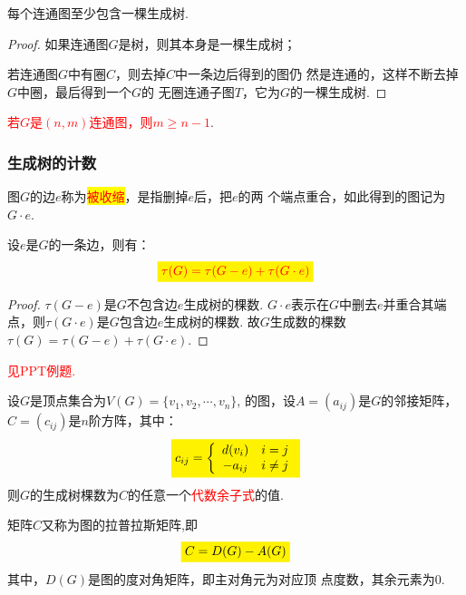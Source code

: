 \begin{theorem}
	每个连通图至少包含一棵生成树.
\end{theorem}
\begin{proof}
	如果连通图$G$是树，则其本身是一棵生成树；
	
	若连通图$G$中有圈$C$，则去掉$C$中一条边后得到的图仍
	然是连通的，这样不断去掉$G$中圈，最后得到一个$G$的
	无圈连通子图$T$，它为$G$的一棵生成树.
\end{proof}


\begin{corollary}
	\textcolor{red}{若$G$是$(n, m)$连通图，则$m\geq n-1$}.
\end{corollary}

\subsubsection{生成树的计数}

\noindent {\bfseries \textcolor{ecolor}{凯莱递推计数法：}}
\begin{definition}
	图$G$的边$e$称为\colorbox{yellow}{\textcolor{red}{被收缩}}，是指删掉$e$后，把$e$的两
	个端点重合，如此得到的图记为$G\cdot e$.
\end{definition}

\begin{theorem}[Cayley]
	设$e$是$G$的一条边，则有：
	\[
	\colorbox{yellow}{\textcolor{red}{$\tau(G) = \tau(G-e) +\tau(G\cdot e) $}}
	\]
\end{theorem}
\begin{proof}
	$\tau(G-e)$是$G$不包含边$e$生成树的棵数. $G\cdot e$表示在$G$中删去$e$并重合其端点，则$\tau(G\cdot e)$是$G$包含边$e$生成树的棵数. 故$G$生成数的棵数$\tau(G) = \tau(G-e) +\tau(G\cdot e)$.
\end{proof}


\textcolor{red}{见PPT例题.}

\noindent {\bfseries \textcolor{ecolor}{矩阵树定理：}}

\begin{theorem}[矩阵树定理]
	设$G$是顶点集合为$V(G)=\{v_1,v_2,\cdots ,v_n\}$,
	的图，设$A=(a_{ij})$是$G$的邻接矩阵，$C=(c_{ij})$是$n$阶方阵，其中：
	\[
	\colorbox{yellow}{$
		c_{ij}=\left\{\begin{array}{cc}
			d(v_i)&i=j \\
			-a_{ij}& i \ne j
		\end{array}\right.
		$}
	\]
	则$G$的生成树棵数为$C$的任意一个\textcolor{red}{代数余子式}的值.
\end{theorem}
\begin{note}
	矩阵$C$又称为图的拉普拉斯矩阵,即
	\[
	\colorbox{yellow}{$ C=D(G)-A(G)$}
	\]其中，$D(G)$是图的度对角矩阵，即主对角元为对应顶
	点度数，其余元素为0.
\end{note}

